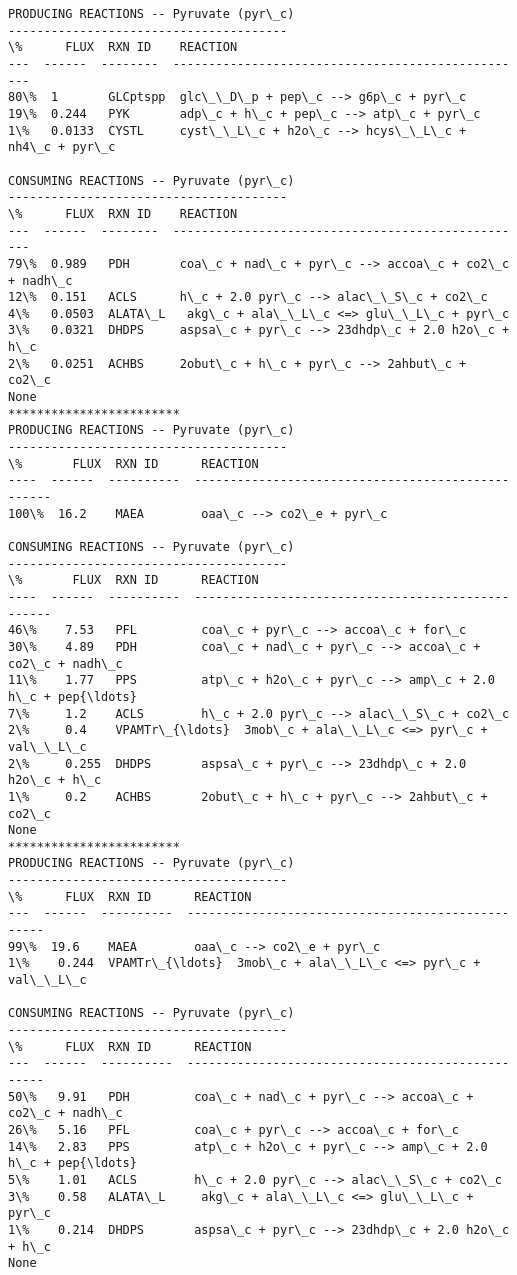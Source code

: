 \documentclass[11pt]{article}
\begin{document}
    \begin{Verbatim}[commandchars=\\\{\}]
PRODUCING REACTIONS -- Pyruvate (pyr\_c)
---------------------------------------
\%      FLUX  RXN ID    REACTION
---  ------  --------  --------------------------------------------------
80\%  1       GLCptspp  glc\_\_D\_p + pep\_c --> g6p\_c + pyr\_c
19\%  0.244   PYK       adp\_c + h\_c + pep\_c --> atp\_c + pyr\_c
1\%   0.0133  CYSTL     cyst\_\_L\_c + h2o\_c --> hcys\_\_L\_c + nh4\_c + pyr\_c

CONSUMING REACTIONS -- Pyruvate (pyr\_c)
---------------------------------------
\%      FLUX  RXN ID    REACTION
---  ------  --------  --------------------------------------------------
79\%  0.989   PDH       coa\_c + nad\_c + pyr\_c --> accoa\_c + co2\_c + nadh\_c
12\%  0.151   ACLS      h\_c + 2.0 pyr\_c --> alac\_\_S\_c + co2\_c
4\%   0.0503  ALATA\_L   akg\_c + ala\_\_L\_c <=> glu\_\_L\_c + pyr\_c
3\%   0.0321  DHDPS     aspsa\_c + pyr\_c --> 23dhdp\_c + 2.0 h2o\_c + h\_c
2\%   0.0251  ACHBS     2obut\_c + h\_c + pyr\_c --> 2ahbut\_c + co2\_c
None
************************
PRODUCING REACTIONS -- Pyruvate (pyr\_c)
---------------------------------------
\%       FLUX  RXN ID      REACTION
----  ------  ----------  --------------------------------------------------
100\%  16.2    MAEA        oaa\_c --> co2\_e + pyr\_c

CONSUMING REACTIONS -- Pyruvate (pyr\_c)
---------------------------------------
\%       FLUX  RXN ID      REACTION
----  ------  ----------  --------------------------------------------------
46\%    7.53   PFL         coa\_c + pyr\_c --> accoa\_c + for\_c
30\%    4.89   PDH         coa\_c + nad\_c + pyr\_c --> accoa\_c + co2\_c + nadh\_c
11\%    1.77   PPS         atp\_c + h2o\_c + pyr\_c --> amp\_c + 2.0 h\_c + pep{\ldots}
7\%     1.2    ACLS        h\_c + 2.0 pyr\_c --> alac\_\_S\_c + co2\_c
2\%     0.4    VPAMTr\_{\ldots}  3mob\_c + ala\_\_L\_c <=> pyr\_c + val\_\_L\_c
2\%     0.255  DHDPS       aspsa\_c + pyr\_c --> 23dhdp\_c + 2.0 h2o\_c + h\_c
1\%     0.2    ACHBS       2obut\_c + h\_c + pyr\_c --> 2ahbut\_c + co2\_c
None
************************
PRODUCING REACTIONS -- Pyruvate (pyr\_c)
---------------------------------------
\%      FLUX  RXN ID      REACTION
---  ------  ----------  --------------------------------------------------
99\%  19.6    MAEA        oaa\_c --> co2\_e + pyr\_c
1\%    0.244  VPAMTr\_{\ldots}  3mob\_c + ala\_\_L\_c <=> pyr\_c + val\_\_L\_c

CONSUMING REACTIONS -- Pyruvate (pyr\_c)
---------------------------------------
\%      FLUX  RXN ID      REACTION
---  ------  ----------  --------------------------------------------------
50\%   9.91   PDH         coa\_c + nad\_c + pyr\_c --> accoa\_c + co2\_c + nadh\_c
26\%   5.16   PFL         coa\_c + pyr\_c --> accoa\_c + for\_c
14\%   2.83   PPS         atp\_c + h2o\_c + pyr\_c --> amp\_c + 2.0 h\_c + pep{\ldots}
5\%    1.01   ACLS        h\_c + 2.0 pyr\_c --> alac\_\_S\_c + co2\_c
3\%    0.58   ALATA\_L     akg\_c + ala\_\_L\_c <=> glu\_\_L\_c + pyr\_c
1\%    0.214  DHDPS       aspsa\_c + pyr\_c --> 23dhdp\_c + 2.0 h2o\_c + h\_c
None

    \end{Verbatim}
\end{document}
